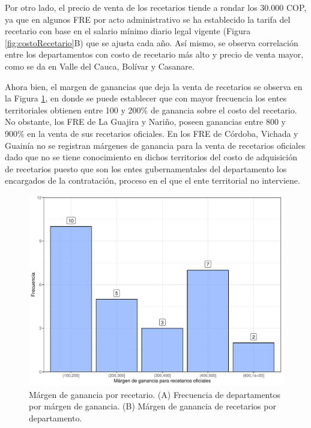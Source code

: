 \documentclass[
]{book}
\begin{document}
Por otro lado, el precio de venta de los recetarios tiende a rondar los 30.000 COP, ya que en algunos FRE por acto administrativo se ha establecido la tarifa del recetario con base en el salario mínimo diario legal vigente (Figura \ref{fig:costoRecetario}B) que se ajusta cada año. Así mismo, se observa correlación entre los departamentos con costo de recetario más alto y precio de venta mayor, como se da en Valle del Cauca, Bolívar y Casanare.

Ahora bien, el margen de ganancias que deja la venta de recetarios se observa en la Figura \ref{fig:comparativoDepartamentos0}, en donde se puede establecer que con mayor frecuencia los entes territoriales obtienen entre 100 y 200\% de ganancia sobre el costo del recetario. No obstante, los FRE de La Guajira y Nariño, poseen ganancias entre 800 y 900\% en la venta de sus recetarios oficiales. En los FRE de Córdoba, Vichada y Guainía no se registran márgenes de ganancia para la venta de recetarios oficiales dado que no se tiene conocimiento en dichos territorios del costo de adquisición de recetarios puesto que son los entes gubernamentales del departamento los encargados de la contratación, proceso en el que el ente territorial no interviene.

\begin{figure}

{\centering \includegraphics[width=1\linewidth]{InformeFinal_files/figure-latex/comparativoDepartamentos0-1} 

}

\caption{Márgen de ganancia por recetario. (A) Frecuencia de departamentos por márgen de ganancia. (B) Márgen de ganancia de recetarios por departamento.}\label{fig:comparativoDepartamentos0}
\end{figure}
\end{document}
